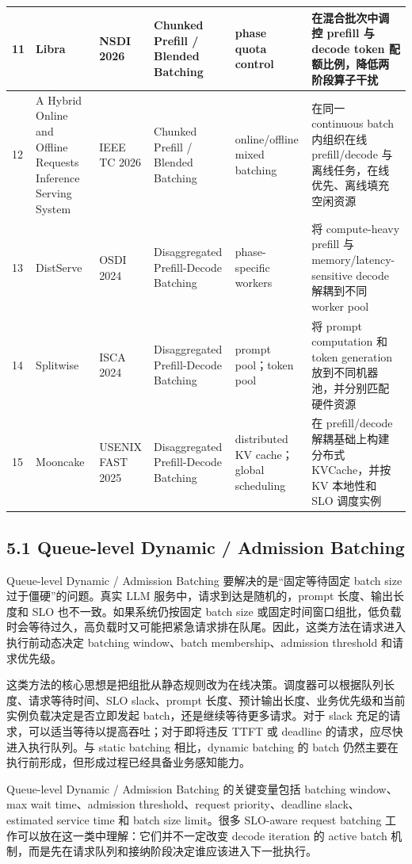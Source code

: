 \documentclass[a4paper,10pt]{ctexart}
\begin{document}
\begin{table}[H]
\begin{tabularx}{\textwidth}{|X|X|X|X|X|X|}
11 & Libra & NSDI 2026 & Chunked Prefill / Blended Batching & phase quota control & 在混合批次中调控 prefill 与 decode token 配额比例，降低两阶段算子干扰 \\ \hline
12 & A Hybrid Online and Offline Requests Inference Serving System & IEEE TC 2026 & Chunked Prefill / Blended Batching & online/offline mixed batching & 在同一 continuous batch 内组织在线 prefill/decode 与离线任务，在线优先、离线填充空闲资源 \\ \hline
13 & DistServe & OSDI 2024 & Disaggregated Prefill-Decode Batching & phase-specific workers & 将 compute-heavy prefill 与 memory/latency-sensitive decode 解耦到不同 worker pool \\ \hline
14 & Splitwise & ISCA 2024 & Disaggregated Prefill-Decode Batching & prompt pool；token pool & 将 prompt computation 和 token generation 放到不同机器池，并分别匹配硬件资源 \\ \hline
15 & Mooncake & USENIX FAST 2025 & Disaggregated Prefill-Decode Batching & distributed KV cache；global scheduling & 在 prefill/decode 解耦基础上构建分布式 KVCache，并按 KV 本地性和 SLO 调度实例 \\ \hline
\end{tabularx}
\end{table}




\subsection*{5.1 Queue-level Dynamic / Admission Batching}

Queue-level Dynamic / Admission Batching 要解决的是“固定等待固定 batch size 过于僵硬”的问题。真实 LLM 服务中，请求到达是随机的，prompt 长度、输出长度和 SLO 也不一致。如果系统仍按固定 batch size 或固定时间窗口组批，低负载时会等待过久，高负载时又可能把紧急请求排在队尾。因此，这类方法在请求进入执行前动态决定 batching window、batch membership、admission threshold 和请求优先级。


这类方法的核心思想是把组批从静态规则改为在线决策。调度器可以根据队列长度、请求等待时间、SLO slack、prompt 长度、预计输出长度、业务优先级和当前实例负载决定是否立即发起 batch，还是继续等待更多请求。对于 slack 充足的请求，可以适当等待以提高吞吐；对于即将违反 TTFT 或 deadline 的请求，应尽快进入执行队列。与 static batching 相比，dynamic batching 的 batch 仍然主要在执行前形成，但形成过程已经具备业务感知能力。


Queue-level Dynamic / Admission Batching 的关键变量包括 batching window、max wait time、admission threshold、request priority、deadline slack、estimated service time 和 batch size limit。很多 SLO-aware request batching 工作可以放在这一类中理解：它们并不一定改变 decode iteration 的 active batch 机制，而是先在请求队列和接纳阶段决定谁应该进入下一批执行。
\end{document}
